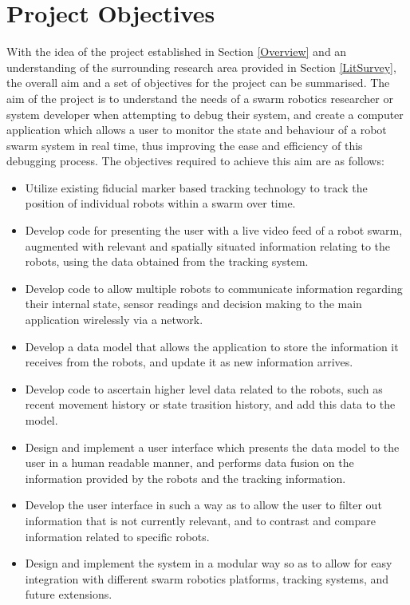 \documentclass[titlepage,hidelinks,10pt]{article}
\begin{document}
\section{Project Objectives} \label{Objectives}
With the idea of the project established in Section \ref{Overview} and an understanding of the surrounding research area provided in Section \ref{LitSurvey}, the overall aim and a set of objectives for the project can be summarised. The aim of the project is to understand the needs of a swarm robotics researcher or system developer when attempting to debug their system, and create a computer application which allows a user to monitor the state and behaviour of a robot swarm system in real time, thus improving the ease and efficiency of this debugging process. The objectives required to achieve this aim are as follows:

\begin{itemize}
	\item Utilize existing fiducial marker based tracking technology to track the position of individual robots within a swarm over time.
	\item Develop code for presenting the user with a live video feed of a robot swarm, augmented with relevant and spatially situated information relating to the robots, using the data obtained from the tracking system.
	\item Develop code to allow multiple robots to communicate information regarding their internal state, sensor readings and decision making to the main application wirelessly via a network.
	\item Develop a data model that allows the application to store the information it receives from the robots, and update it as new information arrives.
	\item Develop code to ascertain higher level data related to the robots, such as recent movement history or state trasition history, and add this data to the model.
	\item Design and implement a user interface which presents the data model to the user in a human readable manner, and performs data fusion on the information provided by the robots and the tracking information.
	\item Develop the user interface in such a way as to allow the user to filter out information that is not currently relevant, and to contrast and compare information related to specific robots.
	\item Design and implement the system in a modular way so as to allow for easy integration with different swarm robotics platforms, tracking systems, and future extensions.
\end{itemize}
\end{document}
